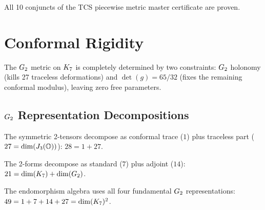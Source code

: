 \begin{theorem}\label{thm:tcs_piecewise_cert}
    \leanok
    All 10 conjuncts of the TCS piecewise metric master certificate are proven.
\end{theorem}


\chapter{Conformal Rigidity}\label{chap:conformal_rigidity}

The $\Gtwo$ metric on $K_7$ is completely determined by two constraints:
$\Gtwo$ holonomy (kills 27 traceless deformations) and $\det(g) = 65/32$
(fixes the remaining conformal modulus), leaving zero free parameters.

\section{\texorpdfstring{$\Gtwo$}{G2} Representation Decompositions}

\begin{theorem}[$\mathrm{Sym}^2(V_7) = 1 \oplus 27$ under $\Gtwo$]\label{thm:sym2_decomp}
    \leanok
    The symmetric 2-tensors decompose as conformal trace ($1$)
    plus traceless part ($27 = \mathrm{dim}(J_3(\mathbb{O}))$):
    $28 = 1 + 27$.
\end{theorem}

\begin{theorem}[$\Lambda^2(V_7) = 7 \oplus 14$ under $\Gtwo$]\label{thm:skew2_decomp}
    \leanok
    The 2-forms decompose as standard ($7$) plus adjoint ($14$):
    $21 = \mathrm{dim}(K_7) + \mathrm{dim}(G_2)$.
\end{theorem}

\begin{theorem}[$\mathrm{End}(V_7) = 1 \oplus 7 \oplus 14 \oplus 27$]\label{thm:end_decomp}
    \leanok
    The endomorphism algebra uses all four fundamental $\Gtwo$ representations:
    $49 = 1 + 7 + 14 + 27 = \mathrm{dim}(K_7)^2$.
\end{theorem}

